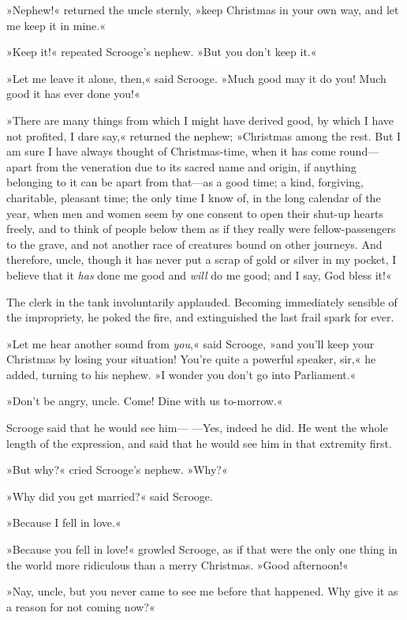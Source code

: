 »Nephew!« returned the uncle sternly, »keep Christmas in your own way, and let me keep it in mine.«

»Keep it!« repeated Scrooge's nephew. »But you don't keep it.«

»Let me leave it alone, then,« said Scrooge. »Much good may it do you! Much good it has ever done you!«

»There are many things from which I might have derived good, by which I have not profited, I dare say,« returned the nephew; »Christmas among the rest. But I am sure I have always thought of Christmas-time, when it has come round---apart from the veneration due to its sacred name and origin, if anything belonging to it can be apart from that---as a good time; a kind, forgiving, charitable, pleasant time; the only time I know of, in the long calendar of the year, when men and women seem by one consent to open their shut-up hearts freely, and to think of people below them as if they really were fellow-passengers to the grave, and not another race of creatures bound on other journeys. And therefore, uncle, though it has never put a scrap of gold or silver in my pocket, I believe that it \textit{has} done me good and \textit{will} do me good; and I say, God bless it!«

The clerk in the tank involuntarily applauded. Becoming immediately sensible of the impropriety, he poked the fire, and extinguished the last frail spark for ever.

»Let me hear another sound from \textit{you},« said Scrooge, »and you'll keep your Christmas by losing your situation! You're quite a powerful speaker, sir,« he added, turning to his nephew. »I wonder you don't go into Parliament.«

»Don't be angry, uncle. Come! Dine with us to-morrow.«

Scrooge said that he would see him--- ---Yes, indeed he did. He went the whole length of the expression, and said that he would see him in that extremity first.

»But why?« cried Scrooge's nephew. »Why?«

»Why did you get married?« said Scrooge.

»Because I fell in love.«

»Because you fell in love!« growled Scrooge, as if that were the only one thing in the world more ridiculous than a merry Christmas. »Good afternoon!«

»Nay, uncle, but you never came to see me before that happened. Why give it as a reason for not coming now?«

